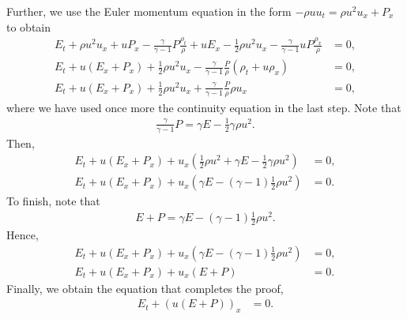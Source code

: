 \begin{questions}
\begin{solution}
Further, we use the Euler momentum equation in the form $-\rho uu_t=\rho u^2u_x+P_x$ to obtain
\begin{align*}
E_t+\rho u^2 u_x+uP_x-\frac{\gamma}{\gamma-1}P\frac{\rho_t}{\rho}+u E_x-\frac{1}{2}\rho u^2 u_x-\frac{\gamma}{\gamma-1}uP\frac{\rho_x}{\rho}&=0,\\
E_t+u(E_x+P_x)+\frac{1}{2}\rho u^2 u_x-\frac{\gamma}{\gamma-1}\frac{P}{\rho}\left(\rho_t+u\rho_x\right)&=0,\\
E_t+u(E_x+P_x)+\frac{1}{2}\rho u^2 u_x+\frac{\gamma}{\gamma-1}\frac{P}{\rho}\rho u_x&=0,
\end{align*}
where we have used once more the continuity equation in the last step. Note that
\begin{align*}
\frac{\gamma}{\gamma-1}P=\gamma E-\frac{1}{2}\gamma\rho u^2.
\end{align*}
Then,
\begin{align*}
E_t+u(E_x+P_x)+u_x\left(\frac{1}{2}\rho u^2+\gamma E-\frac{1}{2}\gamma\rho u^2\right)&=0,\\
E_t+u(E_x+P_x)+u_x\left(\gamma E-(\gamma-1)\frac{1}{2}\rho u^2\right)&=0.
\end{align*}
To finish, note that 
\begin{align*}
E+P = \gamma E-(\gamma-1)\frac{1}{2}\rho u^2.
\end{align*}
Hence,
\begin{align*}
E_t+u(E_x+P_x)+u_x\left(\gamma E-(\gamma-1)\frac{1}{2}\rho u^2\right)&=0,\\
E_t+u(E_x+P_x)+u_x\left(E+P\right)&=0.
\end{align*}
Finally, we obtain the equation that completes the proof,
\begin{align*}
E_t+\left(u\left(E+P\right)\right)_x&=0.
\end{align*}
\end{solution}
\end{questions}
